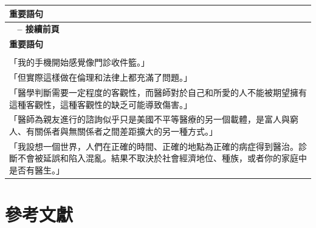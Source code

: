 \documentclass[12pt,a4paper]{article}
\begin{document}
\begin{longtable}{>{\raggedright\arraybackslash}p{15cm}}
\toprule
\textbf{\textcolor{emergency_blue}{重要語句}} \\
\midrule
\endfirsthead

\multicolumn{1}{c}%
{{\bfseries \tablename\ \thetable{} -- 接續前頁}} \\
\toprule
\textbf{\textcolor{emergency_blue}{重要語句}} \\
\midrule
\endhead

\midrule \multicolumn{1}{r}{{接續下頁}} \\ \midrule
\endfoot

\bottomrule
\endlastfoot

「我的手機開始感覺像門診收件籃。」 \\

「但實際這樣做在倫理和法律上都充滿了問題。」 \\

「醫學判斷需要一定程度的客觀性，而醫師對於自己和所愛的人不能被期望擁有這種客觀性，這種客觀性的缺乏可能導致傷害。」\\

「醫師為親友進行的諮詢似乎只是美國不平等醫療的另一個載體，是富人與窮人、有關係者與無關係者之間差距擴大的另一種方式。」 \\

「我設想一個世界，人們在正確的時間、正確的地點為正確的病症得到醫治。診斷不會被延誤和陷入混亂。結果不取決於社會經濟地位、種族，或者你的家庭中是否有醫生。」 \\
\end{longtable}

\section{參考文獻}
\end{document}
